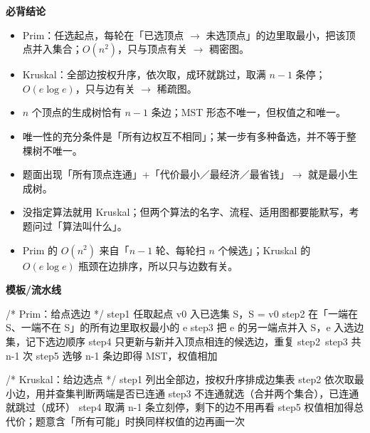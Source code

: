 \documentclass[10pt,a4paper]{ctexart}
\begin{document}






\textbf{必背结论}

\begin{itemize}

\item Prim：任选起点，每轮在「已选顶点 $\to$ 未选顶点」的边里取最小，把该顶点并入集合；$O(n^2)$，只与顶点有关 $\to$ 稠密图。

\item Kruskal：全部边按权升序，依次取，成环就跳过，取满 $n-1$ 条停；$O(e\log e)$，只与边有关 $\to$ 稀疏图。

\item $n$ 个顶点的生成树恰有 $n-1$ 条边；MST 形态不唯一，但权值之和唯一。

\item 唯一性的充分条件是「所有边权互不相同」；某一步有多种备选，并不等于整棵树不唯一。

\item 题面出现「所有顶点连通」+「代价最小／最经济／最省钱」$\to$ 就是最小生成树。

\item 没指定算法就用 Kruskal；但两个算法的名字、流程、适用图都要能默写，考题问过「算法叫什么」。

\item Prim 的 $O(n^2)$ 来自「$n-1$ 轮、每轮扫 $n$ 个候选」；Kruskal 的 $O(e\log e)$ 瓶颈在边排序，所以只与边数有关。

\end{itemize}


\textbf{模板/流水线}

\begin{codebox}
/* Prim：给点选边 */
step1  任取起点 v0 入已选集 S，S = {v0}
step2  在「一端在 S、一端不在 S」的所有边里取权最小的 e
step3  把 e 的另一端点并入 S，e 入选边集，记下选边顺序
step4  只更新与新并入顶点相连的候选边，重复 step2~step3 共 n-1 次
step5  选够 n-1 条边即得 MST，权值相加

/* Kruskal：给边选点 */
step1  列出全部边，按权升序排成边集表
step2  依次取最小边，用并查集判断两端是否已连通
step3  不连通就选（合并两个集合），已连通就跳过（成环）
step4  取满 n-1 条立刻停，剩下的边不用再看
step5  权值相加得总代价；题意含「所有可能」时换同样权值的边再画一次
\end{codebox}
\end{document}
